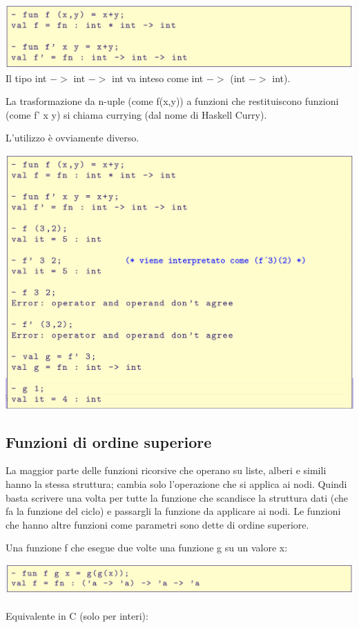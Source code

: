 \documentclass[10pt]{article}
\begin{document}
\includegraphics[scale=0.2]{Immagini/ml28.png}
Il tipo int $->$ int $->$ int va inteso come int $->$ (int $->$ int).

La trasformazione da n-uple (come f(x,y)) a funzioni che restituiscono
funzioni (come f’ x y) si chiama currying (dal nome di Haskell Curry).

L’utilizzo è ovviamente diverso.

\includegraphics[scale=0.2]{Immagini/ml29.png}
\subsection{Funzioni di ordine superiore}
La maggior parte delle funzioni ricorsive che operano su liste,
alberi e simili hanno la stessa struttura; cambia solo l’operazione che si applica ai nodi.
Quindi basta scrivere una volta per tutte la funzione che
scandisce la struttura dati (che fa la funzione del ciclo)
e passargli la funzione da applicare ai nodi.
Le funzioni che hanno altre funzioni come parametri sono
dette di ordine superiore.

Una funzione f che esegue due volte una funzione g su un valore x:

\includegraphics[scale=0.2]{Immagini/ml30.png}
\\\\
Equivalente in C (solo per interi):
\end{document}

